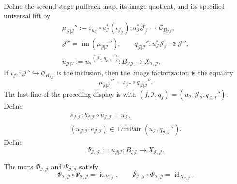 \begin{definition}
\[  \]
  Define the second-stage pullback map, its image quotient, and its specified
  universal lift by
  \[
  \begin{gathered}
    \mu_{\mathcal J|\mathcal I}'':=
      \varepsilon_{u_{\mathcal I}}\circ
        u_{\mathcal I}^*(\iota_{\mathcal J_{\mathcal I}})\colon
      u_{\mathcal I}^*\mathcal J_{\mathcal I}
        \longrightarrow\mathcal O_{B_{\mathcal I\mathcal J}},\\
    \mathcal J''=
      \operatorname{im}(\mu_{\mathcal J|\mathcal I}''),
    \qquad
    q_{\mathcal J|\mathcal I}''\colon
      u_{\mathcal I}^*\mathcal J_{\mathcal I}
        \twoheadrightarrow\mathcal J'',\\
    u_{\mathcal J|\mathcal I}:=
      \widetilde{u_{\mathcal I}}^{
        (\mathcal J_{\mathcal I},q_{\mathcal J|\mathcal I}'')}
      \colon B_{\mathcal I\mathcal J}\longrightarrow
        X_{\mathcal I,\mathcal J},
  \end{gathered}
  \]
  If
  $\iota_{\mathcal J''}\colon\mathcal J''\hookrightarrow
  \mathcal O_{B_{\mathcal I\mathcal J}}$ is the inclusion, then the image
  factorization is the equality
  \[
    \mu_{\mathcal J|\mathcal I}''
      =\iota_{\mathcal J''}\circ q_{\mathcal J|\mathcal I}''. \tag{PCc}
  \]
  The last line of the preceding display is
   with
  $(f,\mathcal I,q_f)=(u_{\mathcal I},\mathcal J_{\mathcal I},
  q_{\mathcal J|\mathcal I}'')$.  Define
  \[
  \begin{gathered}
    e_{\mathcal J|\mathcal I}\colon
      b_{\mathcal J|\mathcal I}\circ u_{\mathcal J|\mathcal I}
        =u_{\mathcal I},\\
    (u_{\mathcal J|\mathcal I},e_{\mathcal J|\mathcal I})
      \in\operatorname{LiftPair}
        (u_{\mathcal I},q_{\mathcal J|\mathcal I}'').
  \end{gathered}                                             \tag{BPC1}
  \]
  Define
  \[
    \Psi_{\mathcal I,\mathcal J}:=
      u_{\mathcal J|\mathcal I}\colon
      B_{\mathcal I\mathcal J}\longrightarrow X_{\mathcal I,\mathcal J}.
  \]
\end{definition}

\begin{theorem}
  \label{thm:nagata-blowup-product-ideal}
  \lean{}

  The maps $\Phi_{\mathcal I,\mathcal J}$ and
  $\Psi_{\mathcal I,\mathcal J}$ satisfy
  \[
    \Phi_{\mathcal I,\mathcal J}\circ\Psi_{\mathcal I,\mathcal J}
      =\operatorname{id}_{B_{\mathcal I\mathcal J}},
    \qquad
    \Psi_{\mathcal I,\mathcal J}\circ\Phi_{\mathcal I,\mathcal J}
      =\operatorname{id}_{X_{\mathcal I,\mathcal J}}.
  \]
\end{theorem}

